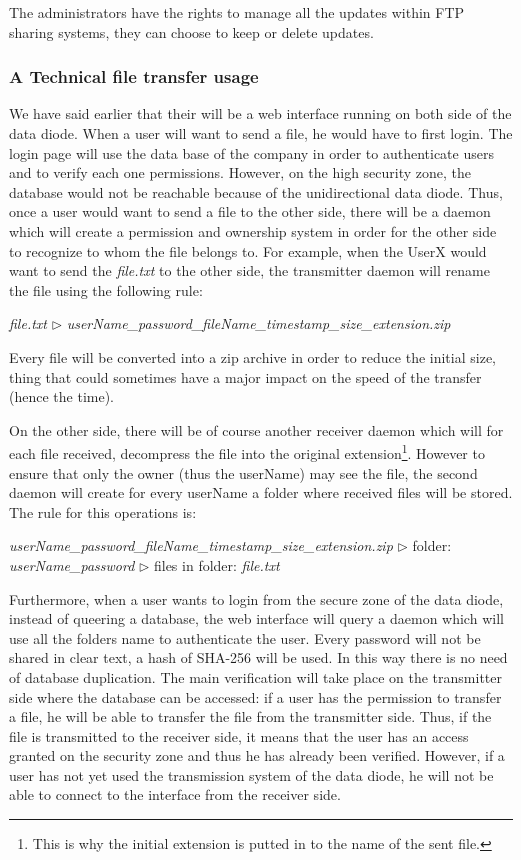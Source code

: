 \documentclass[a4paper,10pt]{article}
\begin{document}
The administrators have the rights to manage all the updates within FTP sharing systems, they can choose to keep or delete updates.

\subsubsection{A Technical file transfer usage}
We have said earlier that their will be a web interface running on both side of the data diode. When a user will want to send a file, he would have to first login. The login page will use the data base of the company in order to authenticate users and to verify each one permissions. However, on the high security zone, the database would not be reachable because of the unidirectional data diode. Thus, once a user would want to send a file to the other side, there will be a daemon which will create a permission and ownership system in order for the other side to recognize to whom the file belongs to. For example, when the UserX would want to send the \emph{file.txt} to the other side, the transmitter daemon will rename the file using the following rule:
\begin{center}
\centering
\emph{file.txt} $\triangleright$ \emph{userName\_password\_fileName\_timestamp\_size\_extension.zip}
\end{center} 

Every file will be converted into a zip archive in order to reduce the initial size, thing that could sometimes have a major impact on the speed of the transfer (hence the time).\bigskip

On the other side, there will be of course another receiver daemon which will for each file received, decompress the file into the original extension\footnote{This is why the initial extension is putted in to the name of the sent file.}. However to ensure that only the owner (thus the userName) may see the file, the second daemon will create for every userName a folder where received files will be stored. The rule for this operations is:
\begin{center}
\centering
\emph{userName\_password\_fileName\_timestamp\_size\_extension.zip} $\triangleright$ folder: \emph{userName\_password} $\triangleright$ files in folder: \emph{file.txt}
\end{center}

Furthermore, when a user wants to login from the secure zone of the data diode, instead of queering a database, the web interface will query a daemon which will use all the folders name to authenticate the user. Every password will not be shared in clear text, a hash of SHA-256 will be used. In this way there is no need of database duplication. The main verification will take place on the transmitter side where the database can be accessed: if a user has the permission to transfer a file, he will be able to transfer the file from the transmitter side. Thus, if the file is transmitted to the receiver side, it means that the user has an access granted on the security zone and thus he has already been verified. However, if a user has not yet used the transmission system of the data diode, he will not be able to connect to the interface from the receiver side.
\end{document}
